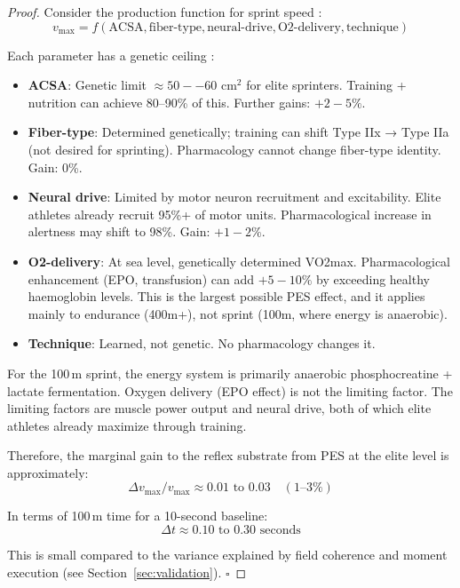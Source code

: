 \documentclass[11pt,twocolumn]{article}
\theoremstyle{definition}
\theoremstyle{remark}
\begin{document}
\begin{proof}
Consider the production function for sprint speed \cite{cavagna1977mechanical,kram1990energetics,bolt2008}:
\begin{equation}
v_{\text{max}} = f(\text{ACSA}, \text{fiber-type}, \text{neural-drive}, \text{O2-delivery}, \text{technique})
\end{equation}

Each parameter has a genetic ceiling \cite{enoka2015neuromechanics}:
\begin{itemize}[leftmargin=1.2em]
\item \textbf{ACSA}: Genetic limit $\approx 50--60$ cm$^2$ for elite sprinters. Training + nutrition can achieve 80--90\% of this. Further gains: $+2-5\%$.
\item \textbf{Fiber-type}: Determined genetically; training can shift Type IIx → Type IIa (not desired for sprinting). Pharmacology cannot change fiber-type identity. Gain: 0\%.
\item \textbf{Neural drive}: Limited by motor neuron recruitment and excitability. Elite athletes already recruit 95\%+ of motor units. Pharmacological increase in alertness may shift to 98\%. Gain: $+1-2\%$.
\item \textbf{O2-delivery}: At sea level, genetically determined VO2max. Pharmacological enhancement (EPO, transfusion) can add $+5-10\%$ by exceeding healthy haemoglobin levels. This is the largest possible PES effect, and it applies mainly to endurance (400m+), not sprint (100m, where energy is anaerobic).
\item \textbf{Technique}: Learned, not genetic. No pharmacology changes it.
\end{itemize}

For the 100\,m sprint, the energy system is primarily anaerobic phosphocreatine + lactate fermentation. Oxygen delivery (EPO effect) is not the limiting factor. The limiting factors are muscle power output and neural drive, both of which elite athletes already maximize through training.

Therefore, the marginal gain to the reflex substrate from PES at the elite level is approximately:
\begin{equation}
\Delta v_{\text{max}} / v_{\text{max}} \approx 0.01 \text{ to } 0.03 \quad (1\text{--}3\%)
\end{equation}

In terms of 100\,m time for a 10-second baseline:
\begin{equation}
\Delta t \approx 0.10 \text{ to } 0.30 \text{ seconds}
\end{equation}

This is small compared to the variance explained by field coherence and moment execution (see Section~\ref{sec:validation}). $\square$
\end{proof}
\end{document}
